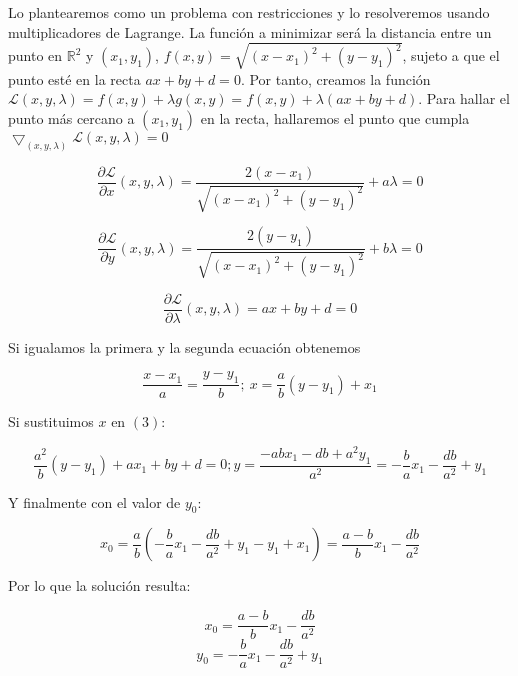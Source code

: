 \documentclass[11pt,leqno]{article}
\theoremstyle{definition}
\begin{document}
\begin{solucion}

Lo plantearemos como un problema con restricciones y lo resolveremos usando multiplicadores de Lagrange. La función a minimizar será la distancia entre un punto en $\mathbb{R}^2$ y $(x_1,y_1)$, $f(x,y)=\sqrt{(x-x_1)^2+(y-y_1)^2}$, sujeto a que el punto esté en la recta $ax+by+d = 0$. Por tanto, creamos la función $\mathcal{L}(x,y,\lambda) = f(x,y) + \lambda g(x,y) = f(x,y) + \lambda(ax+by+d)$. Para hallar el punto más cercano a $(x_1,y_1)$ en la recta, hallaremos el punto que cumpla $\bigtriangledown_{(x,y,\lambda)} \mathcal{L}(x,y,\lambda) = 0$

	\begin{equation}
 		\frac{\partial \mathcal{L}}{\partial x}(x,y,\lambda) =
 			\frac{2(x-x_1)}{\sqrt{(x-x_1)^2+(y-y_1)^2}} + a \lambda = 0
	\end{equation}  

	\begin{equation}
 		\frac{\partial \mathcal{L}}{\partial y}(x,y,\lambda) =
 			\frac{2(y-y_1)}{\sqrt{(x-x_1)^2+(y-y_1)^2}} + b \lambda = 0
	\end{equation}  
	
	\begin{equation}
 		\frac{\partial \mathcal{L}}{\partial \lambda}(x,y,\lambda) = 
 			ax+by+d = 0
	\end{equation}

	Si igualamos la primera y la segunda ecuación obtenemos 
	
	\begin{equation}
		\frac{x-x_1}{a} = \frac{y-y_1}{b};\ x = \frac{a}{b}(y-y_1) + x_1
	\end{equation}
	
	Si sustituimos $x$ en $(3)$:
	
	\begin{equation}
		\frac{a^2}{b}(y-y_1) + ax_1 + by + d = 0;
		y = \frac{-abx_1 -db + a^2 y_1}{a^2} = -\frac{b}{a}{x_1} - \frac{db}{a^2} + y_1
	\end{equation}		
	
	Y finalmente con el valor de $y_0$:
	
	\begin{equation}
		x_0 = \frac{a}{b}(-\frac{b}{a} x_1 - \frac{db}{a^2} + y_1 -y_1 + x_1) = \frac{a-b}{b} x_1 - \frac{db}{a^2}
	\end{equation}
	

	Por lo que la solución resulta:
	
	\[ x_0 = \frac{a-b}{b} x_1 - \frac{db}{a^2}  \]
	\[ y_0 =  -\frac{b}{a}{x_1} - \frac{db}{a^2} + y_1 \]
	
	
\end{solucion}
\end{document}
